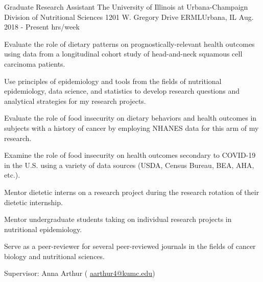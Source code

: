 \begin{cventries}
  \cventry
    {Graduate Research Assistant} %
    {The University of Illinois at Urbana-Champaign \newline Division of Nutritional Sciences } %
    {1201 W. Gregory Drive  ERML\newline Urbana, IL} %
    {Aug. 2018 - Present  hrs/week} %
    {
      \begin{cvitems} %
        \item {Evaluate the role of dietary patterns on prognostically-relevant health outcomes using data from a longitudinal cohort study of head-and-neck squamous cell carcinoma patients.}
        \item {Use principles of epidemiology and tools from the fields of nutritional epidemiology, data science, and statistics to develop research questions and analytical strategies for my research projects.}
        \item {Evaluate the role of food insecurity on dietary behaviors and health outcomes in subjects with a history of cancer by employing NHANES data for this arm of my research.}
        \item {Examine the role of food insecurity on health outcomes secondary to COVID-19 in the U.S. using a variety of data sources (USDA, Census Bureau, BEA, AHA, etc.).}
        \item{Mentor dietetic interns on a research project during the research rotation of their dietetic internship.}
        \item{Mentor undergraduate students taking on individual research projects in nutritional epidemiology.}
        \item{Serve as a peer-reviewer for several peer-reviewed journals in the fields of cancer biology and nutritional sciences.}
        \item {Supervisor: Anna Arthur ( \textcolor{navyblue}{\underline{\href{mailto:aarthur4@kumc.edu}{aarthur4@kumc.edu}}})}
      \end{cvitems}
    }



\end{cventries}
